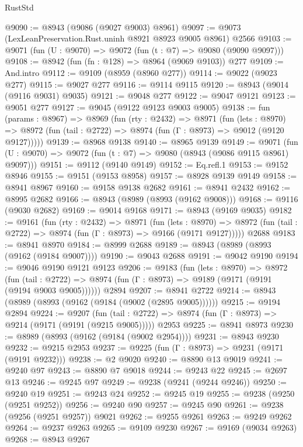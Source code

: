 \begin{lexlean}{RustStd}
\begin{coremodule}
@9090 := @8943 (@9086 (@9027 @9003) @8961)
@9097 := @9073 (LexLeanPreservation.Rust.uninh @8921 @8923 @9005 @8961) @2566
@9103 := @9071 (fun (U : @9070) => @9072 (fun (t : @7) => @9080 (@9090 @9097)))
@9108 := @8942 (fun (fn : @128) => @8964 (@9069 @9103)) @277
@9109 := And.intro
@9112 := @9109 (@8959 (@8960 @277))
@9114 := @9022 (@9023 @277)
@9115 := @9027 @277
@9116 := @9114 @9115
@9120 := @8943 (@9014 (@9116 @9031) @9035)
@9121 := @9048 @277
@9122 := @9047 @9121
@9123 := @9051 @277
@9127 := @9045 (@9122 @9123 @9003 @9005)
@9138 := fun (params : @8967) =>
  @8969
    (fun (rty : @2432) =>
    @8971
      (fun (lets : @8970) =>
      @8972 (fun (tail : @2722) => @8974 (fun (Γ : @8973) => @9012 (@9120 @9127)))))
@9139 := @8968 @9138
@9140 := @8965 @9139
@9149 := @9071 (fun (U : @9070) => @9072 (fun (t : @7) => @9080 (@8943 (@9086 @9115 @8961) @9097)))
@9151 := @9112 (@9140 @9149)
@9152 := Eq.refl.{1}
@9153 := @9152 @8946
@9155 := @9151 (@9153 @8958)
@9157 := @8928 @9139 @9149
@9158 := @8941 @8967
@9160 := @9158 @9138 @2682
@9161 := @8941 @2432
@9162 := @8995 @2682
@9166 := @8943 (@8989 (@8993 (@9162 @9008)))
@9168 := @9116 (@9030 @2682)
@9169 := @9014 @9168
@9171 := @8943 (@9169 @9035)
@9182 := @9161
    (fun (rty : @2432) =>
    @8971
      (fun (lets : @8970) =>
      @8972 (fun (tail : @2722) => @8974 (fun (Γ : @8973) => @9166 (@9171 @9127)))))
    @2688
@9183 := @8941 @8970
@9184 := @8999 @2688
@9189 := @8943 (@8989 (@8993 (@9162 (@9184 @9007))))
@9190 := @9043 @2688
@9191 := @9042 @9190
@9194 := @9046 @9190 @9121 @9123
@9206 := @9183
    (fun (lets : @8970) =>
    @8972
      (fun (tail : @2722) => @8974 (fun (Γ : @8973) => @9189 (@9171 (@9191 (@9194 @9003 @9005))))))
    @2894
@9207 := @8941 @2722
@9214 := @8943 (@8989 (@8993 (@9162 (@9184 (@9002 (@2895 @9005))))))
@9215 := @9194 @2894
@9224 := @9207
    (fun (tail : @2722) => @8974 (fun (Γ : @8973) => @9214 (@9171 (@9191 (@9215 @9005)))))
    @2953
@9225 := @8941 @8973
@9230 := @8989 (@8993 (@9162 (@9184 (@9002 @2954))))
@9231 := @8943 @9230
@9232 := @9215 @2953
@9237 := @9225 (fun (Γ : @8973) => @9231 (@9171 (@9191 @9232)))
@9238 := @2 @9020
@9240 := @8890 @13 @9019
@9241 := @9240 @97
@9243 := @8890 @7 @9018
@9244 := @9243 @22
@9245 := @2697 @13
@9246 := @9245 @97
@9249 := @9238 (@9241 (@9244 @9246))
@9250 := @9240 @19
@9251 := @9243 @24
@9252 := @9245 @19
@9255 := @9238 (@9250 (@9251 @9252))
@9256 := @9240 @90
@9257 := @9245 @90
@9261 := @9238 (@9256 (@9251 @9257)) @9021
@9262 := @9255 @9261
@9263 := @9249 @9262
@9264 := @9237 @9263
@9265 := @9109 @9230
@9267 := @9169 (@9034 @9263)
@9268 := @8943 @9267

\end{coremodule}
\end{lexlean}
